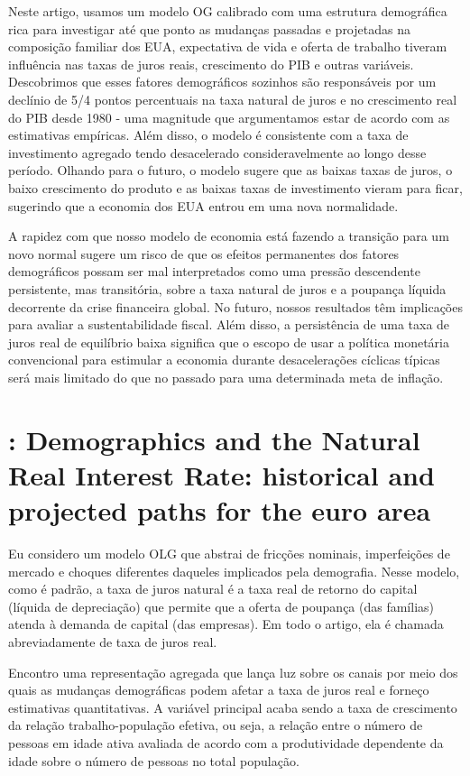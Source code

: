 Neste artigo, usamos um modelo OG calibrado com uma estrutura demográfica rica para investigar até que ponto as mudanças passadas e projetadas na composição familiar dos EUA, expectativa de vida e oferta de trabalho tiveram influência nas taxas de juros reais, crescimento do PIB e outras variáveis. Descobrimos que esses fatores demográficos sozinhos são responsáveis por um declínio de 5/4 pontos percentuais na taxa natural de juros e no crescimento real do PIB desde 1980 - uma magnitude que argumentamos estar de acordo com as estimativas empíricas. Além disso, o modelo é consistente com a taxa de investimento agregado tendo desacelerado consideravelmente ao longo desse período. Olhando para o futuro, o modelo sugere que as baixas taxas de juros, o baixo crescimento do produto e as baixas taxas de investimento vieram para ficar, sugerindo que a economia dos EUA entrou em uma nova normalidade.

A rapidez com que nosso modelo de economia está fazendo a transição para um novo normal sugere um risco de que os efeitos permanentes dos fatores demográficos possam ser mal interpretados como uma pressão descendente persistente, mas transitória, sobre a taxa natural de juros e a poupança líquida decorrente da crise financeira global. No futuro, nossos resultados têm implicações para avaliar a sustentabilidade fiscal. Além disso, a persistência de uma taxa de juros real de equilíbrio baixa significa que o escopo de usar a política monetária convencional para estimular a economia durante desacelerações cíclicas típicas será mais limitado do que no passado para uma determinada meta de inflação.
%
%
\section{\citet{Papetti:2020}: Demographics and the Natural Real Interest Rate: historical and projected paths for the euro area}
Eu considero um modelo OLG que abstrai de fricções nominais, imperfeições de mercado e choques diferentes daqueles implicados pela demografia. Nesse modelo, como é padrão, a taxa de juros natural é a taxa real de retorno do capital (líquida de depreciação) que permite que a oferta de poupança (das famílias) atenda à demanda de capital (das empresas). Em todo o artigo, ela é chamada abreviadamente de taxa de juros real.

Encontro uma representação agregada que lança luz sobre os canais por meio dos quais as mudanças demográficas podem afetar a taxa de juros real e forneço estimativas quantitativas. A variável principal acaba sendo a taxa de crescimento da relação trabalho-população efetiva, ou seja, a relação entre o número de pessoas em idade ativa avaliada de acordo com a produtividade dependente da idade sobre o número de pessoas no total população.

